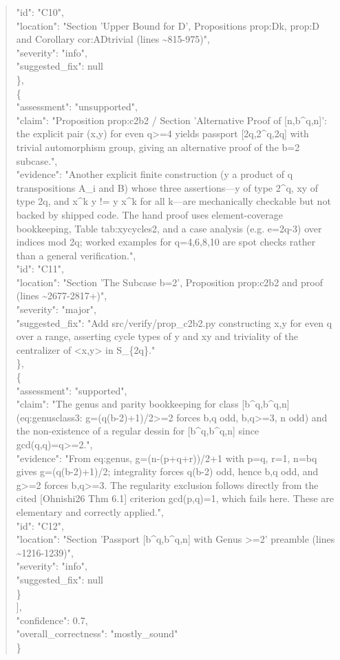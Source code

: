 \documentclass[11pt]{article}
\begin{document}
\begin{quote}
      "id": "C10",\\
      "location": "Section 'Upper Bound for D', Propositions prop:Dk, prop:D and Corollary cor:ADtrivial (lines \~{}815-975)",\\
      "severity": "info",\\
      "suggested\_fix": null\\
    \},\\
    \{\\
      "assessment": "unsupported",\\
      "claim": "Proposition prop:c2b2 / Section 'Alternative Proof of [n,b\^{}q,n]': the explicit pair (x,y) for even q>=4 yields passport [2q,2\^{}q,2q] with trivial automorphism group, giving an alternative proof of the b=2 subcase.",\\
      "evidence": "Another explicit finite construction (y a product of q transpositions A\_i and B) whose three assertions---y of type 2\^{}q, xy of type 2q, and x\^{}k y != y x\^{}k for all k---are mechanically checkable but not backed by shipped code. The hand proof uses element-coverage bookkeeping, Table tab:xycycles2, and a case analysis (e.g. e=2q-3) over indices mod 2q; worked examples for q=4,6,8,10 are spot checks rather than a general verification.",\\
      "id": "C11",\\
      "location": "Section 'The Subcase b=2', Proposition prop:c2b2 and proof (lines \~{}2677-2817+)",\\
      "severity": "major",\\
      "suggested\_fix": "Add src/verify/prop\_c2b2.py constructing x,y for even q over a range, asserting cycle types of y and xy and triviality of the centralizer of <x,y> in S\_\{2q\}."\\
    \},\\
    \{\\
      "assessment": "supported",\\
      "claim": "The genus and parity bookkeeping for class [b\^{}q,b\^{}q,n] (eq:genusclass3: g=(q(b-2)+1)/2>=2 forces b,q odd, b,q>=3, n odd) and the non-existence of a regular dessin for [b\^{}q,b\^{}q,n] since gcd(q,q)=q>=2.",\\
      "evidence": "From eq:genus, g=(n-(p+q+r))/2+1 with p=q, r=1, n=bq gives g=(q(b-2)+1)/2; integrality forces q(b-2) odd, hence b,q odd, and g>=2 forces b,q>=3. The regularity exclusion follows directly from the cited [Ohnishi26 Thm 6.1] criterion gcd(p,q)=1, which fails here. These are elementary and correctly applied.",\\
      "id": "C12",\\
      "location": "Section 'Passport [b\^{}q,b\^{}q,n] with Genus >=2' preamble (lines \~{}1216-1239)",\\
      "severity": "info",\\
      "suggested\_fix": null\\
    \}\\
  ],\\
  "confidence": 0.7,\\
  "overall\_correctness": "mostly\_sound"\\
\}\\
\end{quote}
\end{document}
